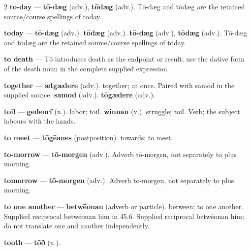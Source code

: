 \begin{multicols}{2}
\textbf{to-day} — \textbf{tō-dæg} (adv.), \textbf{tōdæg} (adv.). Tō-dæg and tōdæg are the retained source/course spellings of today.\par
\textbf{today} — \textbf{tō-dæg} (adv.).  \textbf{tōdæg} (adv.).  \textbf{tō-dæg} (adv.), \textbf{tōdæg} (adv.). Tō-dæg and tōdæg are the retained source/course spellings of today.\par
\textbf{to death} — Tō introduces death as the endpoint or result; use the dative form of the death noun in the complete supplied expression.\par
\textbf{together} — \textbf{ætgædere} (adv.). together; at once. Paired with samod in the supplied source. \textbf{samod} (adv.).  \textbf{tōgædere} (adv.).\par
\textbf{toil} — \textbf{gedeorf} (n.). labor; toil. \textbf{winnan} (v.). struggle; toil. Verb; the subject labours with the hands.\par
\textbf{to meet} — \textbf{tōgēanes} (postposition). towards; to meet.\par
\textbf{to-morrow} — \textbf{tō-morgen} (adv.). Adverb tō-morgen, not separately to plus morning.\par
\textbf{tomorrow} — \textbf{tō-morgen} (adv.). Adverb tō-morgen, not separately to plus morning.\par
\textbf{to one another} — \textbf{betwēonan} (adverb or particle). between; to one another. Supplied reciprocal betwēonan him in 45.6. Supplied reciprocal betwēonan him; do not translate one and another independently.\par
\textbf{tooth} — \textbf{tōð} (n.).\par

\end{multicols}
